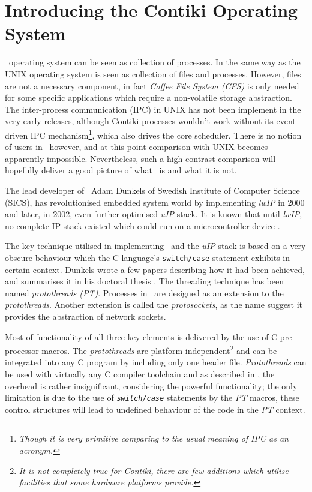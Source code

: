\section{Introducing the Contiki Operating System}\label{sec:CONTIKI}

  \Contiki\ operating system can be seen as collection of processes.
 In the same way as the UNIX operating system is seen as collection of
 files and processes. However, files are not a necessary component, in
 fact \emph{Coffee File System (CFS)} is only needed for some specific
 applications which require a non-volatile storage abstraction. 
  The inter-process communication (IPC) in UNIX has not been implement
 in the very early releases, although Contiki processes wouldn't work
 without its event-driven IPC mechanism\footnote{\emph{Though it is very
 primitive comparing to the usual meaning of IPC as an acronym.}}, which also
 drives the core scheduler. There is no notion of users in \Contiki\,
 however, and at this point comparison with UNIX becomes apparently
 impossible. Nevertheless, such a high-contrast comparison will hopefully
 deliver a good picture of what \ContikiOS\ is and what it is not.


  The lead developer of \Contiki\, Adam Dunkels of Swedish Institute of
 Computer Science (SICS), has revolutionised embedded system world by
 implementing \emph{lwIP} in 2000 and later, in 2002, even further optimised
 \emph{uIP} stack. It is known that until \emph{lwIP}, no complete IP stack
 existed which could run on a microcontroller device \cite{dunkels03full}.

  The key technique utilised in implementing \Contiki\ and the \emph{uIP}
 stack is based on a very obscure behaviour which the C language's
 \texttt{switch/case} statement exhibits in certain context. Dunkels
 wrote a few papers \cite{dunkels05protothreads,dunkels06protothreads}
 describing how it had been achieved, and summarises it in his doctoral
 thesis \cite{dunkels07programming}. The threading technique has been
 named \emph{protothreads (PT)}. Processes in \Contiki\ are designed as
 an extension to the \emph{protothreads}. Another extension is called
 the \emph{protosockets}, as the name suggest it provides the abstraction
 of network sockets.

  Most of functionality of all three key elements is delivered by the use
 of C pre-processor macros. The \emph{protothreads} are platform
 independent\footnote{\emph{It is not completely true for Contiki, there
 are few additions which utilise facilities that some hardware platforms provide.}}
 and can be integrated into any C program by including only one header file.
 \emph{Protothreads} can be used with virtually any C compiler toolchain and
 as described in \cite{dunkels06protothreads}, the overhead is rather
 insignificant, considering the powerful functionality; the only limitation
 is due to the use of \emph{\texttt{switch/case}} statements by the \emph{PT}
 macros, these control structures will lead to undefined behaviour of the
 code in the \emph{PT} context.

